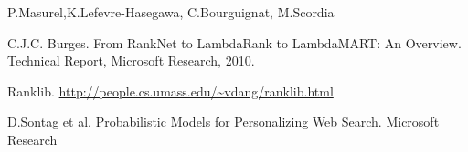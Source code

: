 \documentclass[11pt,letterpaper]{article}
\begin{document}
\begin{thebibliography}{}


\bibitem[1] P.Masurel,K.Lefevre-Hasegawa, C.Bourguignat, M.Scordia 


\bibitem[2] C.J.C. Burges. From RankNet to LambdaRank to
LambdaMART: An Overview. Technical Report, Microsoft Research, 2010.

\bibitem[3] Ranklib.
\url{http://people.cs.umass.edu/~vdang/ranklib.html}

\bibitem[4] D.Sontag et al. Probabilistic Models for Personalizing Web Search.
Microsoft Research


\end{thebibliography}
\end{document}

